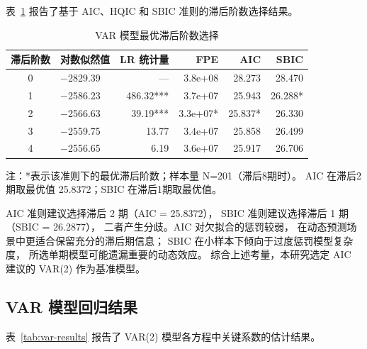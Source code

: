 表~\ref{tab:lag-selection} 报告了基于 AIC、HQIC 和 SBIC 准则的滞后阶数选择结果。

\begin{table}[htbp]
    \centering
    \caption{VAR 模型最优滞后阶数选择}
    \label{tab:lag-selection}
    \begin{tabularx}{\textwidth}{cXrrrr}
        \toprule
        滞后阶数 & 对数似然值 & LR 统计量 & FPE & AIC & SBIC \\
        \midrule
        0 & $-$2829.39 & --- & 3.8e+08 & 28.273 & 28.470 \\
        1 & $-$2586.23 & 486.32*** & 3.7e+07 & 25.943 & 26.288* \\
        2 & $-$2566.63 & 39.19*** & 3.3e+07* & 25.837* & 26.330 \\
        3 & $-$2559.75 & 13.77 & 3.4e+07 & 25.858 & 26.499 \\
        4 & $-$2556.65 & 6.19 & 3.6e+07 & 25.917 & 26.706 \\
        \bottomrule
    \end{tabularx}
    \begin{minipage}{\textwidth}
        \vspace{0.3em}
        \footnotesize 注：*表示该准则下的最优滞后阶数；样本量 N=201（滞后8期时）。
              AIC 在滞后2期取最优值 25.8372；SBIC 在滞后1期取最优值。
    \end{minipage}
\end{table}

AIC 准则建议选择滞后 2 期（AIC = 25.8372），
SBIC 准则建议选择滞后 1 期（SBIC = 26.2877），
二者产生分歧。AIC 对欠拟合的惩罚较弱，
在动态预测场景中更适合保留充分的滞后期信息；
SBIC 在小样本下倾向于过度惩罚模型复杂度，
所选单期模型可能遗漏重要的动态效应。
综合上述考量，本研究选定 AIC 建议的 VAR(2) 作为基准模型。

\subsection{VAR 模型回归结果}

表~\ref{tab:var-results} 报告了 VAR(2) 模型各方程中关键系数的估计结果。

